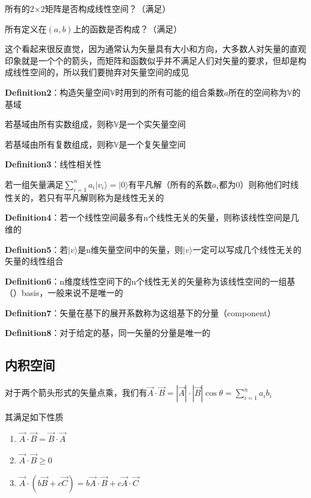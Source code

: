 \documentclass[lang=cn,15pt]{elegantbook}
\begin{document}
所有的2$\times$2矩阵是否构成线性空间？（满足）

所有定义在$(a,b) $上的函数是否构成？（满足）

这个看起来很反直觉，因为通常认为矢量具有大小和方向，大多数人对矢量的直观印象就是一个个的箭头，而矩阵和函数似乎并不满足人们对矢量的要求，但却是构成线性空间的，所以我们要抛弃对矢量空间的成见

\textbf{Definition2}：构造矢量空间$\mathbb{V}$时用到的所有可能的组合乘数$a$所在的空间称为$\mathbb{V}$的基域

若基域由所有实数组成，则称$\mathbb{V}$是一个实矢量空间

若基域由所有复数组成，则称$\mathbb{V}$是一个复矢量空间

\textbf{Definition3}：线性相关性

若一组矢量满足$\sum_{i=1}^n{a_i|v_i\rangle =|0\rangle}$有平凡解（所有的系数$a_i$都为0）则称他们时线性关的，若只有平凡解则称为是线性无关的

\textbf{Definition4}：若一个线性空间最多有n个线性无关的矢量，则称该线性空间是几维的

 \textbf{Definition5}：若$|v\rangle$是n维矢量空间中的矢量，则$|v\rangle$一定可以写成几个线性无关的矢量的线性组合
 
\textbf{Definition6}：n维度线性空间下的n个线性无关的矢量称为该线性空间的一组基（）basis，一般来说不是唯一的

\textbf{Definition7}：矢量在基下的展开系数称为这组基下的分量（component）

\textbf{Definition8}：对于给定的基，同一矢量的分量是唯一的
\subsection{内积空间}

对于两个箭头形式的矢量点乘，我们有$\overrightarrow{A}\cdot \overrightarrow{B}=|\overrightarrow{A}|\cdot |\overrightarrow{B}|\cos \theta =\sum_{i=1}^n{a_ib_i}
$

其满足如下性质
\begin{enumerate}
	\item $\overrightarrow{A}\cdot \overrightarrow{B}=\overrightarrow{B}\cdot \overrightarrow{A}$
	\item $\overrightarrow{A}\cdot \overrightarrow{B}\ge 0$
	\item $\overrightarrow{A}\cdot \left( b\overrightarrow{B}+c\overrightarrow{C} \right) =b\overrightarrow{A}\cdot \overrightarrow{B}+c\overrightarrow{A}\cdot \overrightarrow{C}
	$
\end{enumerate}
\end{document}
